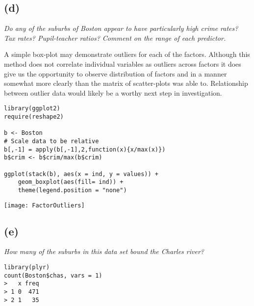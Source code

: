 \documentclass[a4paper,man,natbib]{apa6}
\begin{document}
\subsection{(d)}
\emph{Do any of the suburbs of Boston appear to have particularly
high crime rates? Tax rates? Pupil-teacher ratios? Comment on
the range of each predictor.} \vspace{2em}

A simple box-plot may demonstrate outliers for each of the factors. Although this method does not correlate individual variables as outliers across factors it does give us the opportunity to observe distribution of factors and in a manner somewhat more clearly than the matrix of scatter-plots was able to. Relationship between outlier data would likely be a worthy next step in investigation. \\

\begin{verbatim}
library(ggplot2)
require(reshape2)

b <- Boston
# Scale data to be relative
b[,-1] = apply(b[,-1],2,function(x){x/max(x)})
b$crim <- b$crim/max(b$crim)

ggplot(stack(b), aes(x = ind, y = values)) +
	geom_boxplot(aes(fill= ind)) +
	theme(legend.position = "none") 
\end{verbatim}


\centerline{\texttt{[image: FactorOutliers]}}


\subsection{(e)}
\emph{How many of the suburbs in this data set bound the Charles
river?}
\begin{verbatim}
library(plyr)
count(Boston$chas, vars = 1)
>   x freq
> 1 0  471
> 2 1   35
\end{verbatim}
\end{document}
